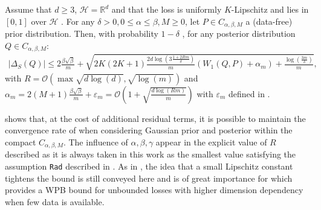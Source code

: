 \begin{theorem}
\label{th: main_gaussian_lpz}
Assume that $d\geq 3$, $\mathcal{H}= \mathbb{R}^d$ and that the loss is uniformly $K$-Lipschitz and lies in $[0,1]$ over $\mathcal{H}$ . For any $\delta>0, 0\leq \alpha\leq \beta, M\geq 0$, let $P\in C_{\alpha,\beta,M}$ a (data-free) prior distribution.
Then, with probability $1-\delta$ , for any posterior distribution $Q\in C_{\alpha,\beta,M}$:
\begin{align*}
|\Delta_S(Q)|  \leq 2\frac{\beta{\sqrt{\beta}}}{m} + \sqrt{2K(2K+1)\frac{2d\log\left(3\frac{1 +2Rm }{\delta}\right)}{m} \left(W_1(Q,P)+\alpha_m \right) + \frac{\log\left( \frac{3m}{\delta} \right)}{m}  },
\end{align*}
with $R=\mathcal{O}(\max \sqrt{d\log(d)},\sqrt{\log(m)})$ and $\alpha_m= 2(M+1)\frac{\beta\sqrt{\beta}}{m} + \varepsilon_m= \mathcal{O}\left(1 + \sqrt{\frac{d\log(Rm)}{m}}\right)$ with $\varepsilon_m$ defined in .
\end{theorem}
 shows that, at the cost of additional residual terms, it is possible to maintain the convergence rate of  when considering Gaussian prior and posterior within the compact $C_{\alpha,\beta,M}$. The influence of $\alpha,\beta,\gamma$ appear in the explicit value of $R$ described as it is always taken in this work as the smallest value satisfying the assumption \texttt{Rad} described in .
As in , the idea that a small Lipschitz constant tightens the bound is still conveyed here and is of great importance for  which provides a WPB bound for unbounded losses with higher dimension dependency when few data is available.
